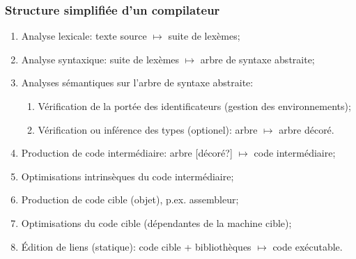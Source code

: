 %
\begin{frame}
\frametitle{Structure simplifiée d'un compilateur}

\begin{enumerate}

  \item Analyse lexicale: texte source $\mapsto$ suite de
    lexèmes;

  \item Analyse syntaxique: suite de lexèmes $\mapsto$
    arbre de syntaxe abstraite;

  \item Analyses sémantiques sur l'arbre de syntaxe
  abstraite:

    \begin{enumerate}

       \item Vérification de la portée des identificateurs
         (gestion des environnements);

       \item Vérification ou inférence des types
         (optionel): arbre $\mapsto$ arbre décoré.

    \end{enumerate}

  \item Production de code intermédiaire: arbre [décoré?]
    $\mapsto$ code intermédiaire;

  \item Optimisations intrinsèques du code intermédiaire;

  \item Production de code cible (objet), p.ex. assembleur;

  \item Optimisations du code cible (dépendantes de la
  machine cible);

  \item Édition de liens (statique): code cible +
    bibliothèques $\mapsto$ code exécutable.

\end{enumerate}

\end{frame}

